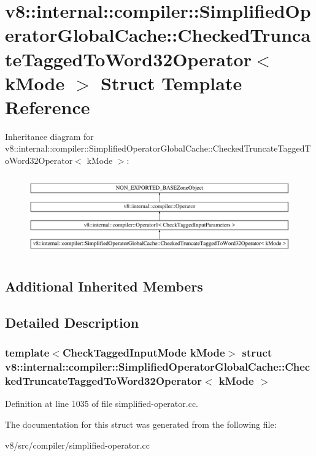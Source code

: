 \hypertarget{structv8_1_1internal_1_1compiler_1_1SimplifiedOperatorGlobalCache_1_1CheckedTruncateTaggedToWord32Operator}{}\section{v8\+:\+:internal\+:\+:compiler\+:\+:Simplified\+Operator\+Global\+Cache\+:\+:Checked\+Truncate\+Tagged\+To\+Word32\+Operator$<$ k\+Mode $>$ Struct Template Reference}
\label{structv8_1_1internal_1_1compiler_1_1SimplifiedOperatorGlobalCache_1_1CheckedTruncateTaggedToWord32Operator}
Inheritance diagram for v8\+:\+:internal\+:\+:compiler\+:\+:Simplified\+Operator\+Global\+Cache\+:\+:Checked\+Truncate\+Tagged\+To\+Word32\+Operator$<$ k\+Mode $>$\+:\begin{figure}[H]
\begin{center}
\leavevmode
\includegraphics[height=3.505477cm]{structv8_1_1internal_1_1compiler_1_1SimplifiedOperatorGlobalCache_1_1CheckedTruncateTaggedToWord32Operator}
\end{center}
\end{figure}
\subsection*{Additional Inherited Members}


\subsection{Detailed Description}
\subsubsection*{template$<$Check\+Tagged\+Input\+Mode k\+Mode$>$\newline
struct v8\+::internal\+::compiler\+::\+Simplified\+Operator\+Global\+Cache\+::\+Checked\+Truncate\+Tagged\+To\+Word32\+Operator$<$ k\+Mode $>$}



Definition at line 1035 of file simplified-\/operator.\+cc.



The documentation for this struct was generated from the following file\+:\begin{DoxyCompactItemize}
\item 
v8/src/compiler/simplified-\/operator.\+cc\end{DoxyCompactItemize}
